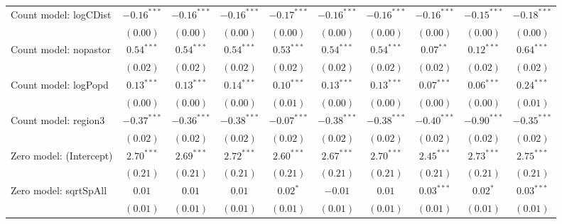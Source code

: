\begin{table}
\begin{center}
{\begin{tabular}{l c c c c c c c c c}
Count model: logCDist          & $-0.16^{***}$ & $-0.16^{***}$ & $-0.16^{***}$ & $-0.17^{***}$   & $-0.16^{***}$ & $-0.16^{***}$   & $-0.16^{***}$   & $-0.15^{***}$ & $-0.18^{***}$ \\
                               & $(0.00)$      & $(0.00)$      & $(0.00)$      & $(0.00)$        & $(0.00)$      & $(0.00)$        & $(0.00)$        & $(0.00)$      & $(0.00)$      \\
Count model: nopastor          & $0.54^{***}$  & $0.54^{***}$  & $0.54^{***}$  & $0.53^{***}$    & $0.54^{***}$  & $0.54^{***}$    & $0.07^{**}$     & $0.12^{***}$  & $0.64^{***}$  \\
                               & $(0.02)$      & $(0.02)$      & $(0.02)$      & $(0.02)$        & $(0.02)$      & $(0.02)$        & $(0.02)$        & $(0.02)$      & $(0.02)$      \\
Count model: logPopd           & $0.13^{***}$  & $0.13^{***}$  & $0.14^{***}$  & $0.10^{***}$    & $0.13^{***}$  & $0.13^{***}$    & $0.07^{***}$    & $0.06^{***}$  & $0.24^{***}$  \\
                               & $(0.00)$      & $(0.00)$      & $(0.00)$      & $(0.01)$        & $(0.00)$      & $(0.00)$        & $(0.00)$        & $(0.00)$      & $(0.01)$      \\
Count model: region3           & $-0.37^{***}$ & $-0.36^{***}$ & $-0.38^{***}$ & $-0.07^{***}$   & $-0.38^{***}$ & $-0.38^{***}$   & $-0.40^{***}$   & $-0.90^{***}$ & $-0.35^{***}$ \\
                               & $(0.02)$      & $(0.02)$      & $(0.02)$      & $(0.02)$        & $(0.02)$      & $(0.02)$        & $(0.02)$        & $(0.02)$      & $(0.02)$      \\
Zero model: (Intercept)        & $2.70^{***}$  & $2.69^{***}$  & $2.72^{***}$  & $2.60^{***}$    & $2.67^{***}$  & $2.70^{***}$    & $2.45^{***}$    & $2.73^{***}$  & $2.75^{***}$  \\
                               & $(0.21)$      & $(0.21)$      & $(0.21)$      & $(0.21)$        & $(0.21)$      & $(0.21)$        & $(0.21)$        & $(0.21)$      & $(0.21)$      \\
Zero model: sqrtSpAll          & $0.01$        & $0.01$        & $0.01$        & $0.02^{*}$      & $-0.01$       & $0.01$          & $0.03^{***}$    & $0.02^{*}$    & $0.03^{***}$  \\
                               & $(0.01)$      & $(0.01)$      & $(0.01)$      & $(0.01)$        & $(0.01)$      & $(0.01)$        & $(0.01)$        & $(0.01)$      & $(0.01)$      \\

\end{tabular}}
\end{center}
\end{table}
